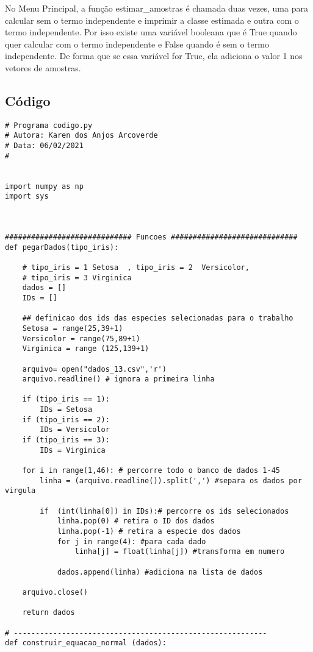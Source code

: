 \documentclass[a4paper,12pt,twoside]{article}
\begin{document}
No Menu Principal, a função estimar\_amostras é chamada duas vezes, uma para calcular sem o termo independente e imprimir a classe estimada e outra com o termo independente. Por isso existe uma variável booleana que é True quando quer calcular com o termo independente e False quando é sem o termo independente. De forma que se essa variável for True, ela adiciona o valor 1 nos vetores de amostras.

\subsection{Código}
\begin{lstlisting}
# Programa codigo.py
# Autora: Karen dos Anjos Arcoverde
# Data: 06/02/2021
#


import numpy as np
import sys



############################# Funcoes #############################
def pegarDados(tipo_iris): 
    
    # tipo_iris = 1 Setosa  , tipo_iris = 2  Versicolor, 
    # tipo_iris = 3 Virginica
    dados = []
    IDs = []
    
    ## definicao dos ids das especies selecionadas para o trabalho
    Setosa = range(25,39+1)
    Versicolor = range(75,89+1)
    Virginica = range (125,139+1)
    
    arquivo= open("dados_13.csv",'r')
    arquivo.readline() # ignora a primeira linha
    
    if (tipo_iris == 1):
        IDs = Setosa
    if (tipo_iris == 2):
        IDs = Versicolor
    if (tipo_iris == 3):
        IDs = Virginica
        
    for i in range(1,46): # percorre todo o banco de dados 1-45
        linha = (arquivo.readline()).split(',') #separa os dados por virgula
    
        if  (int(linha[0]) in IDs):# percorre os ids selecionados
            linha.pop(0) # retira o ID dos dados
            linha.pop(-1) # retira a especie dos dados
            for j in range(4): #para cada dado 
                linha[j] = float(linha[j]) #transforma em numero
                
            dados.append(linha) #adiciona na lista de dados
            
    arquivo.close()
    
    return dados

# ----------------------------------------------------------
def construir_equacao_normal (dados):
    

\end{lstlisting}
\end{document}
